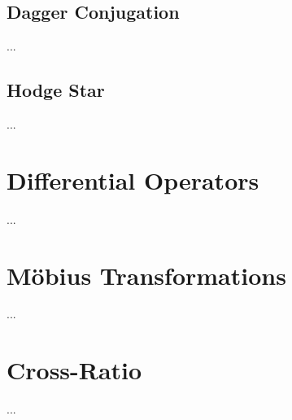 \subsection{Dagger Conjugation}
...
\subsection{Hodge Star}
...
\section{Differential Operators}
...
\section{M\"{o}bius Transformations}
...
\section{Cross-Ratio}
...
